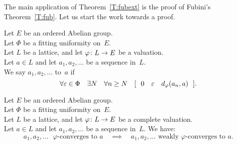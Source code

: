 \documentclass[main.tex]{subfiles}
\begin{document}
The  main application of Theorem~\ref{T:fubext} 
is the proof of Fubini's Theorem~\ref{T:fub}.
Let us start the work towards a proof.
%
%
\begin{dfn}
\label{D:weak-phi-conv}
\label{D:phi-conv-2}
Let $E$ be an ordered Abelian group.\\
Let $\Phi$ be a fitting uniformity on~$E$.\\
Let $L$ be a lattice, and let $\varphi\colon L \rightarrow E$ be a valuation.\\
Let $a \in L$ and let $a_1,a_2,\dotsc$ be a sequence in~$L$.\\
We say $a_1,a_2,\dotsc$ 
 to~$a$
if
\begin{equation*}
\forall \varepsilon \in \Phi \quad \exists N \quad \forall n \geq N \quad
[\ \ 0\quad\varepsilon\quad d_{\smash{\varphi}}(a_n,a)  \ \ ].
\end{equation*}
\end{dfn}
%
%
\begin{lem}
\label{L:weak-phi-conv-implies-phi-conv}
Let $E$ be an ordered Abelian group.\\
Let $\Phi$ be a fitting uniformity on~$E$.\\
Let $L$ be a lattice, and let $\varphi\colon L \rightarrow E$ be a complete valuation.\\
Let $a \in L$ and let $a_1,a_2,\dotsc$ be a sequence in~$L$. We have:
\begin{equation*}
\text{$a_1,a_2,\dotsc$ $\varphi$-converges to~$a$}
\quad\implies\quad
\text{$a_1,a_2,\dotsc$ weakly $\varphi$-converges to~$a$}.
\end{equation*}
\end{lem}
\end{document}
